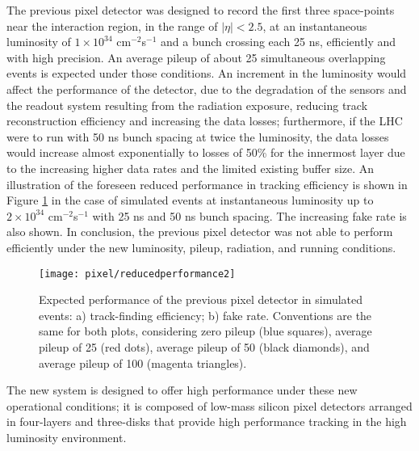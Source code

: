 The previous pixel detector was designed to record the first three space-points near the interaction region, in the range of $|\eta|<2.5$,  at an instantaneous luminosity of $1\times10^{34}$ cm$^{-2}$s$^{-1}$ and a bunch crossing each 25 ns, efficiently and with high precision. An average pileup of about 25 simultaneous overlapping events is expected under those conditions. An increment in the luminosity would affect the performance of the detector, due to the degradation of the sensors and the readout system resulting from the radiation exposure, reducing track reconstruction efficiency and increasing the data losses; furthermore, if the LHC were to run with 50 ns bunch spacing at twice the luminosity, the data losses would increase almost exponentially to losses of 50\% for the innermost layer due to the increasing higher data rates and the limited existing buffer size. An illustration of the foreseen reduced performance in tracking efficiency is shown in Figure \ref{fig:reduced_performance} in the case of simulated \ttbar events at instantaneous luminosity up to $2\times10^{34}$ cm$^{-2}$s$^{-1}$ with 25 ns and 50 ns bunch spacing. The increasing fake rate is also shown. In conclusion, the previous pixel detector was not able to perform efficiently under the new luminosity, pileup, radiation, and running conditions.  

\begin{figure}[!h]
\centering
\texttt{[image: pixel/reducedperformance2]}
\caption[Expected performance of the previous pixel detector in simulated \ttbar events.]{Expected performance of the previous pixel detector in simulated \ttbar events: a) track-finding efficiency; b) fake rate. Conventions are the same for both plots, considering zero pileup (blue squares), average pileup of 25 (red dots), average pileup of 50 (black diamonds), and average pileup of 100 (magenta triangles).}\label{fig:reduced_performance}
\end{figure}

The new system is designed to offer high performance under these new operational conditions; it is composed of low-mass silicon pixel detectors arranged in four-layers and three-disks that provide high performance tracking in the high luminosity environment.



